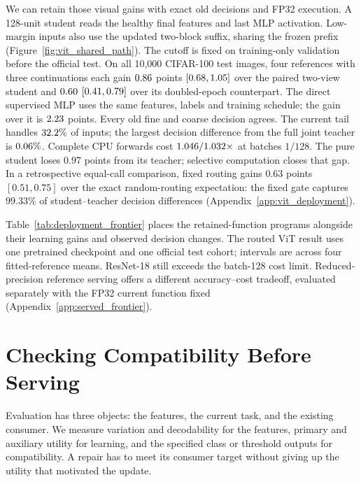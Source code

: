 \documentclass{article}
\begin{document}
We can retain those visual gains with exact old decisions and FP32
execution. A 128-unit student reads the healthy final features and last
MLP activation. Low-margin inputs also use the updated two-block suffix,
sharing the frozen prefix (Figure~\ref{fig:vit_shared_path}). The cutoff
is fixed on training-only validation before the official test. On all
10,000 CIFAR-100 test images, four references with three continuations
each gain $0.86$ points
$[0.68,1.05]$ over the paired two-view student
and $0.60$ $[0.41,0.79]$
over its doubled-epoch counterpart. The direct supervised MLP uses the
same features, labels and training schedule; the gain over it is
$2.23$ points. Every old fine and coarse decision
agrees. The current tail handles $32.2\%$ of inputs;
the largest decision difference from the full joint teacher is
$0.06\%$. Complete CPU forwards cost
$1.046/1.032\times$ at batches $1/128$.
The pure student loses $0.97$ points from its teacher; selective
computation closes that gap. In a retrospective equal-call comparison,
fixed routing gains $0.63$ points $[0.51,0.75]$ over the exact random-routing
expectation: the fixed gate captures $99.33\%$ of student--teacher
decision differences (Appendix~\ref{app:vit_deployment}).



Table~\ref{tab:deployment_frontier} places the retained-function programs
alongside their learning gains and observed decision changes. The routed
ViT result uses one pretrained checkpoint and one official test cohort;
intervals are across four fitted-reference means. ResNet-18 still exceeds
the batch-128 cost limit. Reduced-precision reference serving offers a
different accuracy--cost tradeoff, evaluated separately with the FP32
current function fixed (Appendix~\ref{app:served_frontier}).

\section{Checking Compatibility Before Serving}\label{sec:standard}

Evaluation has three objects: the features, the current task, and the existing
consumer. We measure variation and decodability for the features, primary and
auxiliary utility for learning, and the specified class or threshold outputs
for compatibility. A repair has to meet its consumer target without giving up
the utility that motivated the update.
\end{document}
